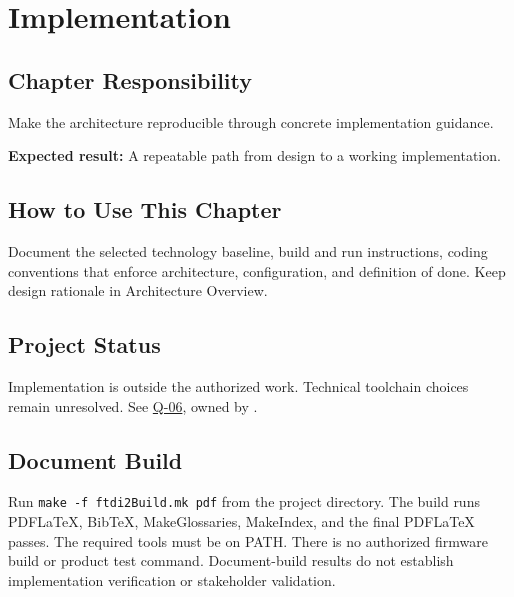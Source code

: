 \chapter{Implementation}
\section{Chapter Responsibility}
\label{Section:ImplementationResponsibility}
Make the architecture reproducible through concrete implementation guidance.

\noindent\textbf{Expected result:} A repeatable path from design to a working implementation.

\section{How to Use This Chapter}
Document the selected technology baseline, build and run instructions, coding conventions that enforce architecture, configuration, and definition of done. Keep design rationale in Architecture Overview.

\section{Project Status}
Implementation is outside the authorized work. Technical toolchain choices remain unresolved.
See \hyperref[Question:Q-06]{Q-06}, owned by \DocumentOwner.

\section{Document Build}
\label{Section:ProjectBuild}
Run \texttt{make -f ftdi2Build.mk pdf} from the project directory.
The build runs PDFLaTeX, BibTeX, MakeGlossaries, MakeIndex, and the final
PDFLaTeX passes. The required tools must be on PATH. There is no authorized
firmware build or product test command. Document-build results do not establish
implementation verification or stakeholder validation.
